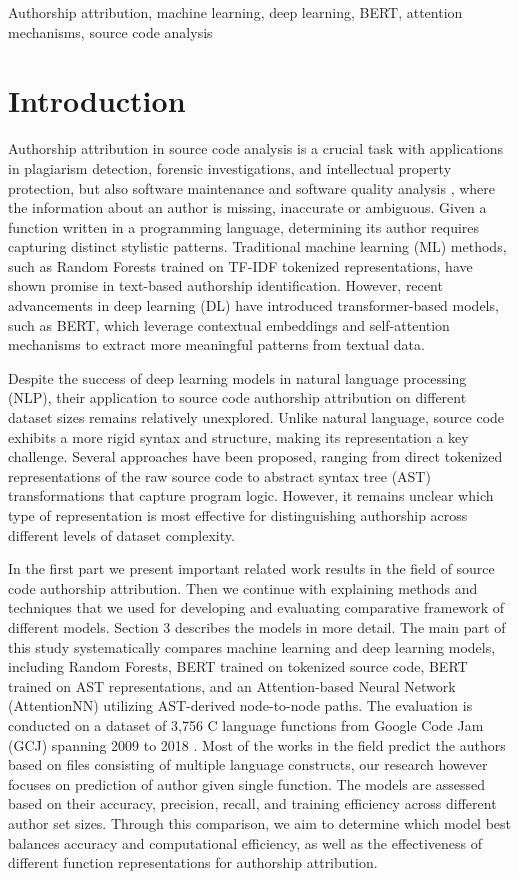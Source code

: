\documentclass[conference]{IEEEtran}
\begin{document}
\begin{IEEEkeywords}
    Authorship attribution, machine learning, deep learning, BERT, attention mechanisms, source code analysis
    \end{IEEEkeywords}

\section{Introduction}

Authorship attribution in source code analysis is a crucial task 
with applications in plagiarism detection, forensic investigations, and 
intellectual property protection, but also software maintenance 
and software quality analysis \cite{pbnn}, where the information about an author 
is missing, inaccurate or ambiguous.
Given a function written in a programming
language, determining its author requires capturing distinct stylistic 
patterns. Traditional machine learning (ML) methods, such as Random 
Forests trained on TF-IDF tokenized representations, have shown promise 
in text-based authorship identification. However, recent advancements 
in deep learning (DL) have introduced transformer-based models, such as 
BERT, which leverage contextual embeddings and self-attention mechanisms 
to extract more meaningful patterns from textual data.

Despite the success of deep learning models in natural language 
processing (NLP), their application to source code authorship attribution on different dataset sizes 
remains relatively unexplored. Unlike natural language, source code 
exhibits a more rigid syntax and structure, making its representation 
a key challenge. Several approaches have been proposed, ranging from 
direct tokenized representations of the raw source code to abstract 
syntax tree (AST) transformations that capture program logic. However, 
it remains unclear which type of representation is most effective for 
distinguishing authorship across different levels of dataset complexity.

In the first part we present important related work results in the field of source 
code authorship attribution. Then we continue with explaining methods and techniques 
that we used for developing and evaluating comparative framework of different models.
Section 3 describes the models in more detail.
The main part of this study systematically compares machine learning and deep learning 
models, including Random Forests, BERT trained on tokenized source code, 
BERT trained on AST representations, and an Attention-based Neural Network 
(AttentionNN) utilizing AST-derived node-to-node paths. The evaluation is 
conducted on a dataset of 3,756 C language functions from Google Code Jam 
(GCJ) spanning 2009 to 2018 \citet{petrik}. Most of the works in the field
predict the authors based on files consisting of multiple language constructs, our 
research however focuses on prediction of author given single function.
The models are assessed based on their accuracy, precision, recall, and training efficiency across different 
author set sizes. Through this comparison, we aim to determine which model best balances 
accuracy and computational efficiency, as well as the effectiveness of 
different function representations for authorship attribution.
\end{document}
